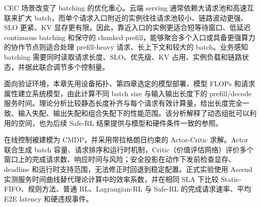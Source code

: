 CEC 场景改变了 batching 的优化重心。云端 serving 通常依赖大请求池和高速互联来扩大 batch，而单个请求入口附近的实例往往请求池较小、链路波动更强、SLO 更紧、KV 显存更有限。因此，靠近入口的实例更适合短等待窗口、低延迟 continuous batching 和保守的 chunked prefill，能够聚合多个入口或具备更强算力的协作节点则适合处理 prefill-heavy 请求、长上下文和较大的 batch。业务感知 batching 需要同时读取请求长度、SLO、优先级、KV 占用、实例负载和链路状态，并据此联合调节多个控制量。

面向验证环境，本章先用设备拓扑、第四章选定的模型部署、模型 FLOPs 和请求属性建立系统模型，由此计算不同 batch size 与输入输出长度下的 prefill/decode 服务时间。理论分析比较静态长度补齐与每个请求有效计算量，给出长度完全一致、输入失配、输出失配和组合失配下的性能范围。该分析解释了动态组批可以利用的空间，也为后续 Safe-RL 结果提供与模型和硬件条件一致的参照。

在线控制被建模为 CMDP，并采用带拉格朗日约束的 Actor-Critic 求解。Actor 联合生成 batch 容量、请求排序和运行时机制，Critic（价值评估网络）评价多个窗口上的完成请求数、响应时间与风险；安全投影在动作下发前检查显存、deadline 和运行时支持范围，无法修正时回退到稳定配置。正式实验使用 Ascend 实测服务时间曲线替代理论计算中的效率系数，并在相同 SLA 下比较 Static-FIFO、规则方法、普通 RL、Lagrangian-RL 与 Safe-RL 的完成请求速率、平均 E2E latency 和硬违规事件。
